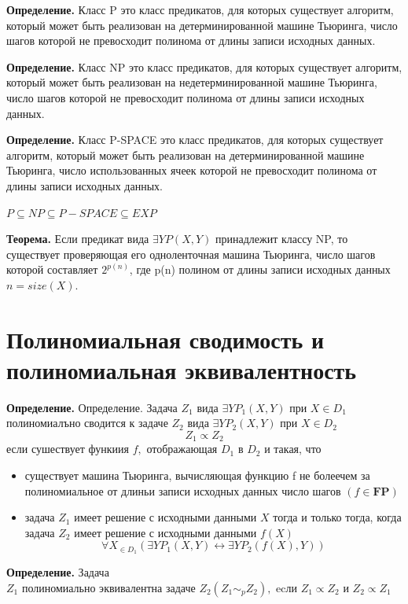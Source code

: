 \documentclass[40pt]{article}
\begin{document}
\textbf{Определение.} Класс P это класс предикатов, для которых существует алгоритм, который может быть реализован на детерминированной машине Тьюринга, число шагов которой не превосходит полинома
от длины записи исходных данных.

\textbf{Определение.} Класс NP это класс предикатов, для которых существует алгоритм, который может быть реализован на недетерминированной машине Тьюринга, число шагов которой не превосходит полинома
от длины записи исходных данных.

\textbf{Определение.} Класс P-SPACE это класс предикатов, для которых существует алгоритм, который может быть реализован на детерминированной машине Тьюринга, число использованных ячеек которой
не превосходит полинома от длины записи исходных данных.

$P \subseteq NP \subseteq P-SPACE \subseteq EXP$

\textbf{Теорема.} Если предикат вида $\exists Y P(X, Y )$ принадлежит классу
NP, то существует проверяющая его одноленточная машина Тьюринга, число шагов которой составляет $2^{p(n)}$, где p(n) полином от длины записи исходных данных $n = size(X)$.

\section{Полиномиальная сводимость и полиномиальная эквивалентность}

\textbf{Определение.} Определение. Задача $Z_{1}$ вида $\exists Y P_{1}(X, Y)$ при $X \in D_{1}$ полиномиалъно сводится к задаче $Z_{2}$ вида $\exists Y P_{2}(X, Y)$ при $X \in D_{2}$
$$
Z_{1} \propto Z_{2}
$$
если сушествует функиия $f,$ отображающая $D_{1}$ в $D_{2}$ и такая, что
\begin{itemize}
    \item существует машина Тьюринга, вычисляющая функцию f не болеечем за полиномиальное от длиньи записи исходных данных число шагов $(f \in \mathbf{F P})$
    \item задача $Z_{1}$ имеет решение с исходными данными $X$ тогда и только тогда, когда задача $Z_{2}$ имеет решение с исходными данными $f(X)$
$$
\forall X_{\in D_{1}}\left(\exists Y P_{1}(X, Y) \leftrightarrow \exists Y P_{2}(f(X), Y)\right)
$$
\end{itemize}


 \textbf{Определение.} Задача  $Z_{1} \text { полиномиально эквивалентна задаче } Z_{2}
\left(Z_{1} \sim_{p} Z_{2}\right), \text { ecли } Z_{1} \propto Z_{2} \text { и } Z_{2} \propto Z_{1}$
\end{document}
